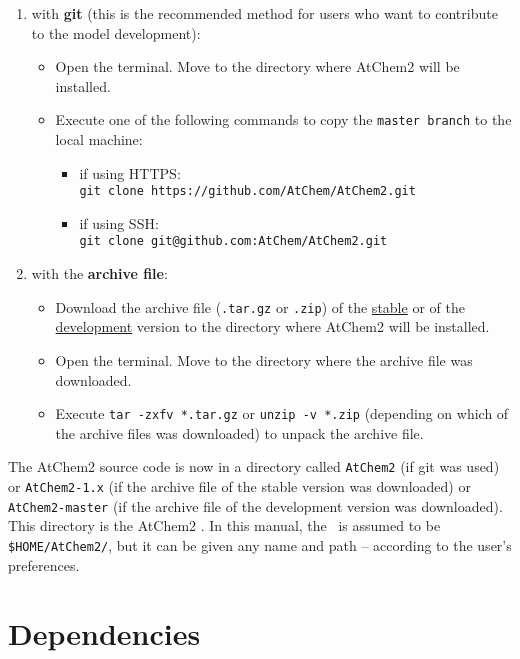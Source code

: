 \begin{enumerate}
\item with \textbf{git} (this is the recommended method for users who
  want to contribute to the model development):
  \begin{itemize}
  \item Open the terminal. Move to the directory where AtChem2 will be
    installed.
  \item Execute one of the following commands to copy the
    \texttt{master\ branch} to the local machine:
    \begin{itemize}
      \item if using HTTPS:\\
        \verb|git clone https://github.com/AtChem/AtChem2.git|
      \item if using SSH:\\
        \verb|git clone git@github.com:AtChem/AtChem2.git|
    \end{itemize}
  \end{itemize}
\item with the \textbf{archive file}:
  \begin{itemize}
  \item Download the archive file (\texttt{.tar.gz} or \texttt{.zip}) of the
    \href{https://github.com/AtChem/AtChem2/releases}{stable} or of the
    \href{https://github.com/AtChem/AtChem2/archive/master.zip}{development}
    version to the directory where AtChem2 will be installed.
  \item Open the terminal. Move to the directory where the archive
    file was downloaded.
  \item Execute \verb|tar -zxfv *.tar.gz| or \verb|unzip -v *.zip|
    (depending on which of the archive files was downloaded) to unpack
    the archive file.
  \end{itemize}
\end{enumerate}

The AtChem2 source code is now in a directory called \texttt{AtChem2}
(if git was used) or \texttt{AtChem2-1.x} (if the archive file of the
stable version was downloaded) or \texttt{AtChem2-master} (if the
archive file of the development version was downloaded). This
directory is the AtChem2 \maindir. In this manual, the \maindir\ is
assumed to be \texttt{\$HOME/AtChem2/}, but it can be given any name
and path -- according to the user's preferences.

\section{Dependencies} \label{sec:dependencies}

